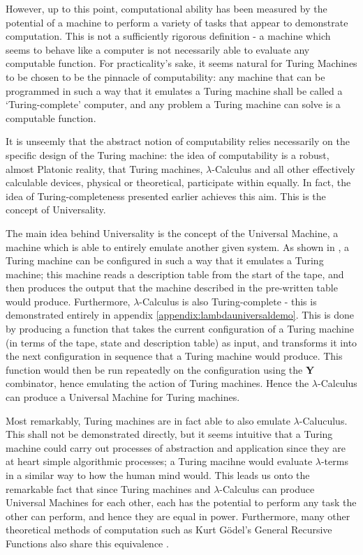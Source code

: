 \documentclass[Master.tex]{subfiles}
\begin{document}
However, up to this point, computational ability has been measured by the potential of a machine to perform a variety of tasks that appear to demonstrate computation. This is not a sufficiently rigorous definition - a machine which seems to behave like a computer is not necessarily able to evaluate any computable function. For practicality's sake, it seems natural for Turing Machines to be chosen to be the pinnacle of computability: any machine that can be programmed in such a way that it emulates a Turing machine shall be called a  `Turing-complete' computer, and any problem a Turing machine can solve is a computable function.

It is unseemly that the abstract notion of computability relies necessarily on the specific design of the Turing machine: the idea of computability is a robust, almost Platonic reality, that Turing machines, $\lambda$-Calculus and all other effectively calculable devices, physical or theoretical, participate within equally. In fact, the idea of Turing-completeness presented earlier achieves this aim. This is the concept of Universality.

The main idea behind Universality is the concept of the Universal Machine, a machine which is able to entirely emulate another given system. As shown in \cite{turing1936computablenumbers}, a Turing machine can be configured in such a way that it emulates a Turing machine; this machine reads a description table from the start of the tape, and then produces the output that the machine described in the pre-written table would produce. Furthermore, $\lambda$-Calculus is also Turing-complete - this is demonstrated entirely in appendix \ref{appendix:lambdauniversaldemo}. This is done by producing a function that takes the current configuration of a Turing machine (in terms of the tape, state and description table) as input, and transforms it into the next configuration in sequence that a Turing machine would produce. This function would then be run repeatedly on the configuration using the \textbf{Y} combinator, hence emulating the action of Turing machines. Hence the $\lambda$-Calculus can produce a Universal Machine for Turing machines.

Most remarkably, Turing machines are in fact able to also emulate $\lambda$-Caluculus. This shall not be demonstrated directly, but it seems intuitive that a Turing machine could carry out processes of abstraction and application since they are at heart simple algorithmic processes; a Turing macihne would evaluate $\lambda$-terms in a similar way to how the human mind would. This leads us onto the remarkable fact that since Turing machines and $\lambda$-Calculus can produce Universal Machines for each other, each has the potential to perform any task the other can perform, and hence they are equal in power. Furthermore, many other theoretical methods of computation such as Kurt G\"odel's General Recursive Functions also share this equivalence \cite{copeland2002ctt}.
\end{document}
